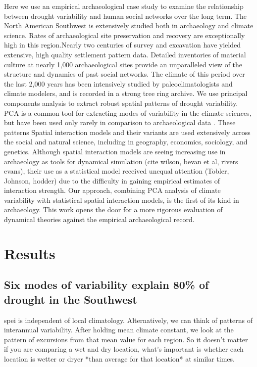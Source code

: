 \documentclass[fleqn,10pt]{wlscirep}
\begin{document}
Here we use an empirical archaeological case study to examine the relationship between drought variability and human social networks over the long term. The North American Southwest is extensively studied both in archaeology and climate science. Rates of archaeological site preservation and recovery are exceptionally high in this region.Nearly two centuries of survey and excavation have yielded extensive, high quality settlement pattern data. Detailed inventories of material culture at nearly 1,000 archaeological sites provide an unparalleled view of the structure and dynamics of past social networks. The climate of this period over the last 2,000 years has been intensively studied by paleoclimatologists and climate modelers, and is recorded in a strong tree ring archive. We use principal components analysis to extract robust spatial patterns of drought variability. PCA is a common tool for extracting modes of variability in the climate sciences, but have been used only rarely in comparison to archaeological data \cite{Weiss1982,vanwest}. These patterns Spatial interaction models and their variants are used extensively across the social and natural science, including in geography, economics, sociology, and genetics. Although spatial interaction models are seeing increasing use in archaeology as tools for dynamical simulation (cite wilson, bevan et al, rivers evans), their use as a statistical model received unequal attention (Tobler, Johnson, hodder) due to the difficulty in gaining empirical estimates of interaction strength. Our approach, combining PCA analysis of climate variability with statistical spatial interaction models, is the first of its kind in archaeology. This work opens the door for a more rigorous evaluation of dynamical theories against the empirical archaeological record.


\section*{Results}

\subsection*{Six modes of variability explain 80\% of drought in the Southwest}

spei is independent of local climatology. Alternatively, we can think of patterns of interannual variability. After holding mean climate constant, we look at the pattern of excursions from that mean value for each region. So it doesn't matter if you are comparing a wet and dry location, what's important is whether each location is wetter or dryer *than average for that location* at similar times.
\end{document}
